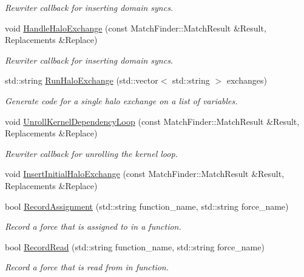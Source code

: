 \begin{DoxyCompactItemize}
\begin{DoxyCompactList}\small\item\em Rewriter callback for inserting domain syncs. \end{DoxyCompactList}\item 
void \mbox{\hyperlink{namespacews2st_1_1dependency__detection_a2fb1055539651e10f0186e060fbf74ea}{Handle\+Halo\+Exchange}} (const Match\+Finder\+::\+Match\+Result \&Result, Replacements \&Replace)
\begin{DoxyCompactList}\small\item\em Rewriter callback for inserting domain syncs. \end{DoxyCompactList}\item 
std\+::string \mbox{\hyperlink{namespacews2st_1_1dependency__detection_a3d9867901e8b37524b810b5d95a6cc25}{Run\+Halo\+Exchange}} (std\+::vector$<$ std\+::string $>$ exchanges)
\begin{DoxyCompactList}\small\item\em Generate code for a single halo exchange on a list of variables. \end{DoxyCompactList}\item 
void \mbox{\hyperlink{namespacews2st_1_1dependency__detection_a8b77ddddfc773081dd720230552c93c2}{Unroll\+Kernel\+Dependency\+Loop}} (const Match\+Finder\+::\+Match\+Result \&Result, Replacements \&Replace)
\begin{DoxyCompactList}\small\item\em Rewriter callback for unrolling the kernel loop. \end{DoxyCompactList}\item 
void \mbox{\hyperlink{namespacews2st_1_1dependency__detection_ac413a69373ef6abece419cac50b0a1bc}{Insert\+Initial\+Halo\+Exchange}} (const Match\+Finder\+::\+Match\+Result \&Result, Replacements \&Replace)
\item 
bool \mbox{\hyperlink{namespacews2st_1_1dependency__detection_afa94b48529c6c085e21d3025069d8085}{Record\+Assignment}} (std\+::string function\+\_\+name, std\+::string force\+\_\+name)
\begin{DoxyCompactList}\small\item\em Record a force that is assigned to in a function. \end{DoxyCompactList}\item 
bool \mbox{\hyperlink{namespacews2st_1_1dependency__detection_ab3cedd87fe75ce246104ca77531d29b2}{Record\+Read}} (std\+::string function\+\_\+name, std\+::string force\+\_\+name)
\begin{DoxyCompactList}\small\item\em Record a force that is read from in function. \end{DoxyCompactList}\item 

\end{DoxyCompactItemize}
